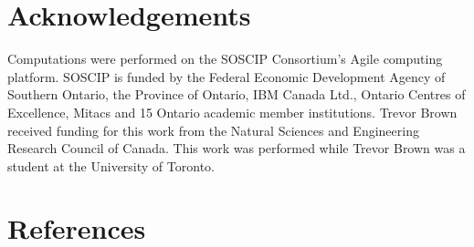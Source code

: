 \documentclass[review]{elsarticle}
\begin{document}
\linenumbers





%

%


\section*{Acknowledgements}
Computations were performed on the SOSCIP Consortium’s Agile computing platform. 
SOSCIP is funded by the Federal Economic Development Agency of Southern Ontario, the Province of Ontario, IBM Canada Ltd., 
Ontario Centres of Excellence, Mitacs and 15 Ontario academic member institutions. 
Trevor Brown received funding for this work from the Natural Sciences and Engineering Research Council of Canada.
This work was performed while Trevor Brown was a student at the University of Toronto.


\section*{References}


\end{document}
